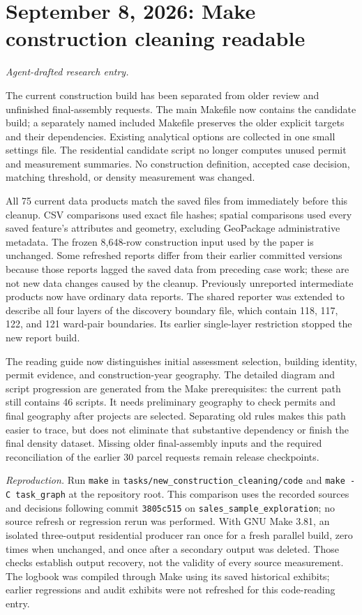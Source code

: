 \clearpage
\section*{September 8, 2026: Make construction cleaning readable}
\textit{Agent-drafted research entry.}

The current construction build has been separated from older review and
unfinished final-assembly requests. The main Makefile now contains the candidate
build; a separately named included Makefile preserves the older explicit targets
and their dependencies. Existing analytical options are collected in one small
settings file. The residential candidate script no longer computes unused permit
and measurement summaries. No construction definition, accepted case decision,
matching threshold, or density measurement was changed.

All 75 current data products match the saved files from immediately before this
cleanup. CSV comparisons used exact file hashes; spatial comparisons used every
saved feature's attributes and geometry, excluding GeoPackage administrative
metadata. The frozen 8,648-row construction input used by the paper is unchanged.
Some refreshed reports differ from their earlier committed versions because those
reports lagged the saved data from preceding case work; these are not new data
changes caused by the cleanup. Previously unreported intermediate products now
have ordinary data reports. The shared reporter was extended to describe all four
layers of the discovery boundary file, which contain 118, 117, 122, and 121 ward-pair
boundaries. Its earlier single-layer restriction stopped the new report build.

The reading guide now distinguishes initial assessment selection, building
identity, permit evidence, and construction-year geography. The detailed diagram
and script progression are generated from the Make prerequisites: the current
path still contains 46 scripts. It needs preliminary geography to check permits
and final geography after projects are selected. Separating old rules makes this
path easier to trace, but does not eliminate that substantive dependency or finish
the final density dataset. Missing older final-assembly inputs and the required
reconciliation of the earlier 30 parcel requests remain release checkpoints.

\textit{Reproduction.} Run \texttt{make} in
\texttt{tasks/new\_construction\_cleaning/code} and
\texttt{make -C task\_graph} at the repository root. This comparison uses the
recorded sources and decisions following commit \texttt{3805c515} on
\texttt{sales\_sample\_exploration}; no source refresh or regression rerun was
performed. With GNU Make 3.81, an isolated three-output residential producer ran
once for a fresh parallel build, zero times when unchanged, and once after a
secondary output was deleted. Those checks establish output recovery, not the
validity of every source measurement. The logbook was compiled through Make using
its saved historical exhibits; earlier regressions and audit exhibits were not
refreshed for this code-reading entry.
